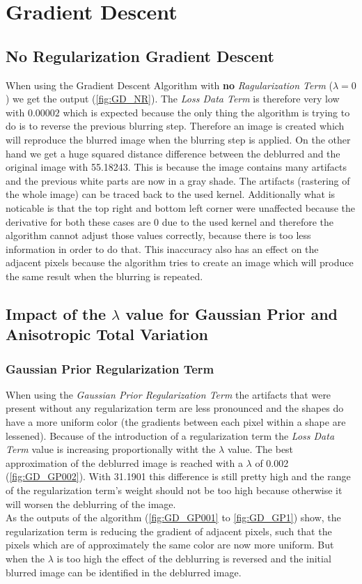 \documentclass{report}
\begin{document}
	\section{Gradient Descent}
	\startsection
		\renewcommand{\thesubsection}{\thesection.\alph{subsection}}
		\subsection{No Regularization Gradient Descent}
		\startsubsection
			When using the Gradient Descent Algorithm with \textbf{no} \textit{Ragularization Term} ($\lambda = 0$) we get the output (\ref{fig:GD_NR}). The \textit{Loss Data Term} is therefore very low with $0.00002$ which is expected because the only thing the algorithm is trying to do is to reverse the previous blurring step. Therefore an image is created which will reproduce the blurred image when the blurring step is applied. On the other hand we get a huge squared distance difference between the deblurred and the original image with 55.18243. This is because the image contains many artifacts and the previous white parts are now in a gray shade. The artifacts (rastering of the whole image) can be traced back to the used kernel. Additionally what is noticable is that the top right and bottom left corner were unaffected because the derivative for both these cases are 0 due to the used kernel and therefore the algorithm cannot adjust those values correctly, because there is too less information in order to do that. This inaccuracy also has an effect on the adjacent pixels because the algorithm tries to create an image which will produce the same result when the blurring is repeated.
		\closesection
		\subsection{Impact of the $\lambda$ value for Gaussian Prior and Anisotropic Total Variation}
		\startsubsection
			\subsubsection{Gaussian Prior Regularization Term}
			\startsubsection
				When using the \textit{Gaussian Prior Regularization Term} the artifacts that were present without any regularization term are less pronounced and the shapes do have a more uniform color (the gradients between each pixel within a shape are lessened). Because of the introduction of a regularization term the \textit{Loss Data Term} value is increasing proportionally witht the $\lambda$ value. The best approximation of the deblurred image is reached with a $\lambda$ of 0.002 (\ref{fig:GD_GP002}). With 31.1901 this difference is still pretty high and the range of the regularization term's weight should not be too high because otherwise it will worsen the deblurring of the image. \\
				As the outputs of the algorithm (\ref{fig:GD_GP001} to \ref{fig:GD_GP1}) show, the regularization term is reducing the gradient of adjacent pixels, such that the pixels which are of approximately the same color are now more uniform. But when the $\lambda$ is too high the effect of the deblurring is reversed and the initial blurred image can be identified in the deblurred image.
			\closesection
\end{document}
